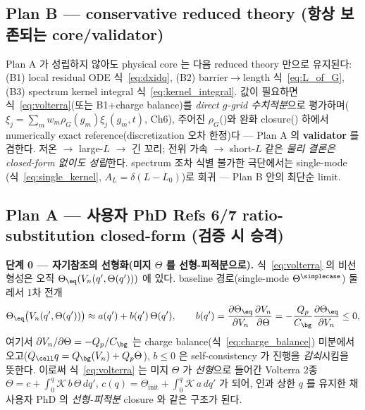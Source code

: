 \subsection{Plan B — conservative reduced theory (항상 보존되는 core/validator)}\label{sec:planB}
Plan A 가 성립하지 않아도 physical core 는 다음 reduced theory 만으로 유지된다: (B1) local residual
ODE 식~\eqref{eq:dxidq}, (B2) barrier$\to$length 식~\eqref{eq:L_of_G}, (B3) spectrum kernel integral
식~\eqref{eq:kernel_integral}. 값이 필요하면 식~\eqref{eq:volterra}(또는 B1+charge balance)를
\emph{direct $g$-grid 수치적분}으로 평가하며($\xi_j=\sum_m w_m\rho_G(g_m)\xi_j(g_m,t)$, Ch6), 주어진
$\rho_G$()와 완화 closure() 하에서 numerically exact reference(discretization 오차 한정)다 —
Plan A 의 \textbf{validator} 를 겸한다. 저온 $\to$ large-$L$ $\to$ 긴 꼬리; 전위 가속 $\to$ short-$L$
같은 \emph{물리 결론은 closed-form 없이도 성립}한다. spectrum 조차 식별 불가한 극단에서는 single-mode
(식~\eqref{eq:single_kernel}, $A_L=\delta(L-L_0)$)로 회귀 — Plan B 안의 최단순 limit.

\subsection{Plan A — 사용자 PhD Refs 6/7 ratio-substitution closed-form (검증 시 승격)}\label{sec:planA}
\textbf{단계 0 — 자기참조의 선형화(미지 $\Theta$ 를 선형-피적분으로).} 식~\eqref{eq:volterra} 의
비선형성은 오직 $\Theta_\eq(V_n(q',\Theta(q')))$ 에 있다. baseline 경로(single-mode $\Theta^\simplecase$)
둘레서 1차 전개
\begin{equation}
\Theta_\eq\big(V_n(q',\Theta(q'))\big)\approx a(q')+b(q')\,\Theta(q'),\qquad
b(q')=\frac{\partial\Theta_\eq}{\partial V_n}\frac{\partial V_n}{\partial\Theta}
=-\frac{Q_p}{C_\bg}\frac{\partial\Theta_\eq}{\partial V_n}\le0,
\label{eq:selfcoupling}
\end{equation}
여기서 $\partial V_n/\partial\Theta=-Q_p/C_\bg$ 는 charge balance(식~\eqref{eq:charge_balance}) 미분에서
오고($Q_\cell q=Q_\bg(V_n)+Q_p\Theta$), $b\le0$ 은 self-consistency 가 진행을 \emph{감쇠}시킴을 뜻한다.
이로써 식~\eqref{eq:volterra} 는 미지 $\Theta$ 가 \emph{선형}으로 들어간 Volterra 2종
$\Theta=c+\int_0^q\mathcal K\,b\,\Theta\,dq'$, $c(q)=\Theta_\mathrm{init}+\int_0^q\mathcal K\,a\,dq'$ 가 되어,
인과 상한 $q$ 를 유지한 채 사용자 PhD 의 \emph{선형-피적분} closure 와 같은 구조가 된다.

